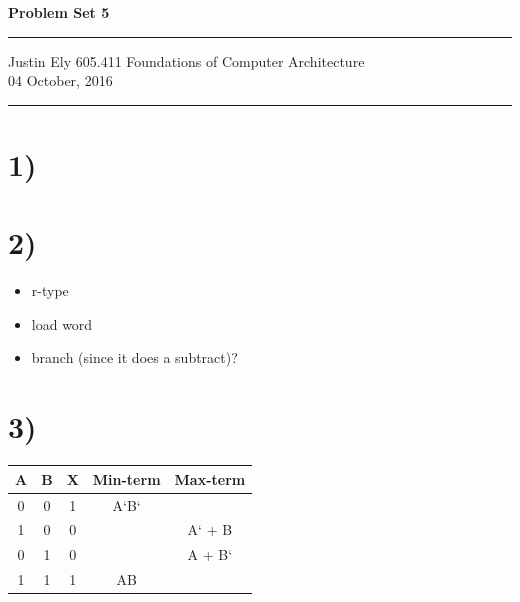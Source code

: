 \documentclass[a4paper,11pt]{article}
\begin{document}
\begin{flushright}

\vspace{1.1cm}

{\bf\Huge Problem Set 5}

\rule{0.25\linewidth}{0.5pt}

\vspace{0.5cm}
Justin Ely
\linebreak
\newline
\footnotesize{605.411 Foundations of Computer Architecture \\}
\vspace{0.5cm}
04 October, 2016
\end{flushright}

\noindent\rule{\linewidth}{1.0pt}


\section*{1)}


\section*{2)} 
\begin{itemize}
 \item r-type
 \item load word
 \item branch (since it does a subtract)?
\end{itemize}


\section*{3)}
\begin{tabular}{| c | c | c | c | c | }
  \hline	
       A & B & X  & Min-term & Max-term \\  \hline
       0 & 0 & 1 & A`B` & \\  \hline
       1 & 0 & 0 & & A` + B\\  \hline
       0 & 1 & 0 & & A + B`\\  \hline
       1 & 1 & 1 & AB & \\  \hline
\end{tabular} \\
\end{document}
